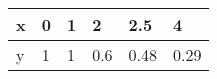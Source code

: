 \documentclass{article}
\begin{document}
\begin{table}[h!]
\begin{tabular}{llllll}

\multicolumn{1}{p{30.865313pt}}{\raggedright x} & \multicolumn{1}{p{31.618126pt}}{\raggedright 0} & \multicolumn{1}{p{31.618126pt}}{\raggedright 1} & \multicolumn{1}{p{33.876564pt}}{\raggedright 2} & \multicolumn{1}{p{37.640625pt}}{\raggedright 2.5} & \multicolumn{1}{p{33.876564pt}}{\raggedright 4}\\ 
\hline 
\multicolumn{1}{p{30.865313pt}}{\raggedright y} & \multicolumn{1}{p{31.618126pt}}{\raggedright 1} & \multicolumn{1}{p{31.618126pt}}{\raggedright 1} & \multicolumn{1}{p{33.876564pt}}{\raggedright 0.6} & \multicolumn{1}{p{37.640625pt}}{\raggedright 0.48} & \multicolumn{1}{p{33.876564pt}}{\raggedright 0.29}\\ 


\end{tabular}
\end{table}
\end{document}
